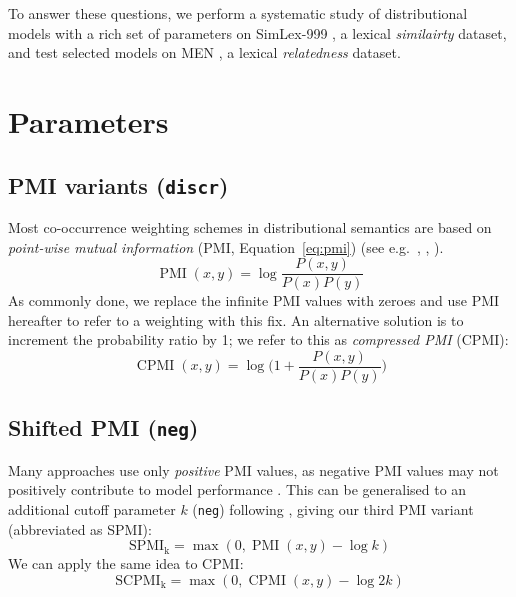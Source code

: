 \documentclass[11pt]{article}
\begin{document}
To answer these questions, we perform a systematic study of distributional models with a rich set of parameters on SimLex-999  \cite{hill2014simlex}, a lexical \emph{similairty} dataset, and test selected models on MEN \cite{Bruni:2014:MDS:2655713.2655714}, a lexical \emph{relatedness} dataset.

\section{Parameters}
\label{sec:parameters}



\subsection{PMI variants (\texttt{discr})}
\label{sec:pmi-variants}

Most co-occurrence weighting schemes in distributional semantics are based on \emph{point-wise mutual information} (PMI, Equation~\ref{eq:pmi}) (see e.g.~, , ).
%
\begin{equation}
  \label{eq:pmi}
  \operatorname{PMI}(x, y) = \log\frac{P(x,y)}{P(x)P(y)}
\end{equation}
%
%
As commonly done, we replace the infinite PMI values with zeroes and use PMI hereafter to refer to a
weighting with this fix.
%
An alternative solution is to increment the probability ratio by 1; we refer to this as \textit{compressed PMI} (CPMI):
%
\begin{equation}
  \label{eq:cpmi}
  \operatorname{CPMI}(x, y) = \log\Big( 1 + \frac{P(x,y)}{P(x)P(y)} \Big)
\end{equation}




\subsection{Shifted PMI (\texttt{neg})}
\label{sec:shifted-pmi}

Many approaches use only \emph{positive} PMI values, as  negative PMI values may not positively contribute to model performance \cite{Turney:2010:FMV:1861751.1861756}. This can be generalised to an additional cutoff parameter $k$ (\texttt{neg}) following , giving our third PMI variant (abbreviated as SPMI):
%
\begin{equation}
  \label{eq:ppmi}
  \operatorname{SPMI_k} = \max (0, \operatorname{PMI}(x, y) - \log k)
\end{equation}
%
We can apply the same idea to CPMI:
%
\begin{equation}
  \label{eq:pcpmi}
  \operatorname{SCPMI_k} = \max (0, \operatorname{CPMI}(x, y) - \log 2k)
\end{equation}
\end{document}
